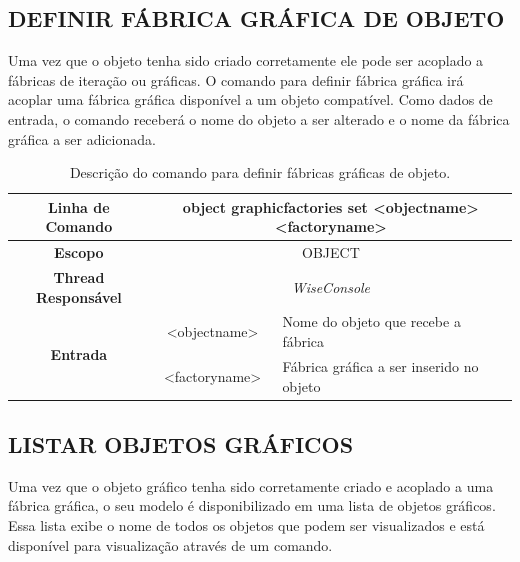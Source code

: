 \subsection{DEFINIR FÁBRICA GRÁFICA DE OBJETO}\label{sec:graphic_factories_set}

Uma vez que o objeto tenha sido criado corretamente ele pode ser acoplado a fábricas de iteração ou gráficas. O comando para definir fábrica gráfica irá acoplar uma fábrica gráfica disponível a um objeto compatível. Como dados de entrada, o comando receberá o nome do objeto a ser alterado e o nome da fábrica gráfica a ser adicionada.

\begin{center}
	\begin{table}[!htbp]
		\begin{tabularx}{\textwidth}{c|c|X}
			\toprule
			\textbf{Linha de Comando} & \multicolumn{2}{c}{object graphic\underline{\space\space}factories set <object\underline{\space\space}name> <factory\underline{\space\space}name>} \\
			\midrule
			\textbf{Escopo} & \multicolumn{2}{c}{OBJECT} \\
			\hline
			\textbf{Thread Responsável} & \multicolumn{2}{c}{\textit{WiseConsole}} \\
			\hline
			\multirow{2}{*}{\textbf{Entrada}} & <object\underline{\space\space}name> & Nome do objeto que  recebe a fábrica \\
			& <factory\underline{\space\space}name> & Fábrica gráfica a ser inserido no objeto \\
			\bottomrule
		\end{tabularx}
		\caption{Descrição do comando para definir fábricas gráficas de objeto.}
		\label{tab:graphic_factories_set}
	\end{table}
\end{center}

\subsection{LISTAR OBJETOS GRÁFICOS}\label{sec:graphic_list}

Uma vez que o objeto gráfico tenha sido corretamente criado e acoplado a uma fábrica gráfica, o seu modelo é disponibilizado em uma lista de objetos gráficos. Essa lista exibe o nome de todos os objetos que podem ser visualizados e está disponível para visualização através de um comando.

